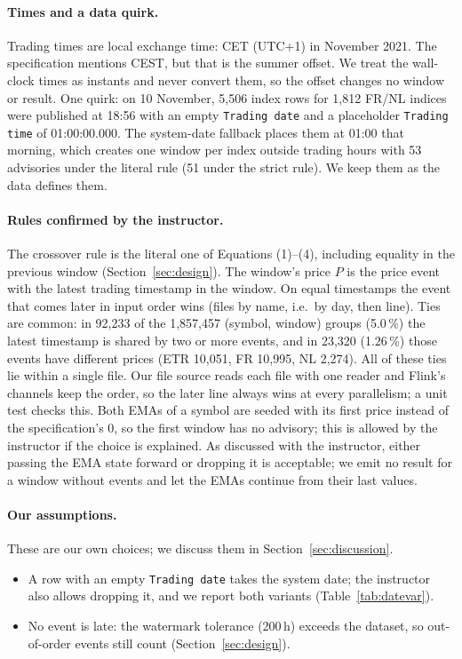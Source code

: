 \documentclass[sigconf,nonacm]{acmart}
\begin{document}
\paragraph{Times and a data quirk.} Trading times are local exchange time:
CET (UTC+1) in November 2021. The specification mentions CEST, but that is the
summer offset. We treat the wall-clock times as instants and never convert them,
so the offset changes no window or result. One quirk: on 10 November, 5,506
index rows for 1,812 FR/NL indices were published at 18:56 with an empty
\texttt{Trading date} and a placeholder \texttt{Trading time} of 01:00:00.000.
The system-date fallback places them at 01:00 that morning, which creates one
window per index outside trading hours with 53 advisories under the literal
rule (51 under the strict rule). We keep them as the data defines them.

\paragraph{Rules confirmed by the instructor.} The crossover rule is the
literal one of Equations (1)--(4), including equality in the previous window
(Section~\ref{sec:design}). The window's price $P$ is the price event with the
latest trading timestamp in the window. On equal timestamps the event that
comes later in input order wins (files by name, i.e.\ by day, then line). Ties
are common: in 92,233 of the 1,857,457 (symbol, window) groups (5.0\,\%) the
latest timestamp is shared by two or more events, and in 23,320 (1.26\,\%)
those events have different prices (ETR 10,051, FR 10,995, NL 2,274). All of
these ties lie within a single file. Our file source reads each file with one
reader and Flink's channels keep the order, so the later line always wins at
every parallelism; a unit test checks this. Both EMAs of a symbol are seeded
with its first price instead of the specification's 0, so the first window has
no advisory; this is allowed by the instructor if the choice is explained.
As discussed with the instructor, either passing the EMA state forward or
dropping it is acceptable; we emit no result for a window without events and
let the EMAs continue from their last values.

\paragraph{Our assumptions.} These are our own choices; we discuss them in
Section~\ref{sec:discussion}.
\begin{itemize}
\item A row with an empty \texttt{Trading date} takes the system date; the
  instructor also allows dropping it, and we report both variants
  (Table~\ref{tab:datevar}).
\item No event is late: the watermark tolerance (200\,h) exceeds the dataset,
  so out-of-order events still count (Section~\ref{sec:design}).
\end{itemize}
\end{document}
